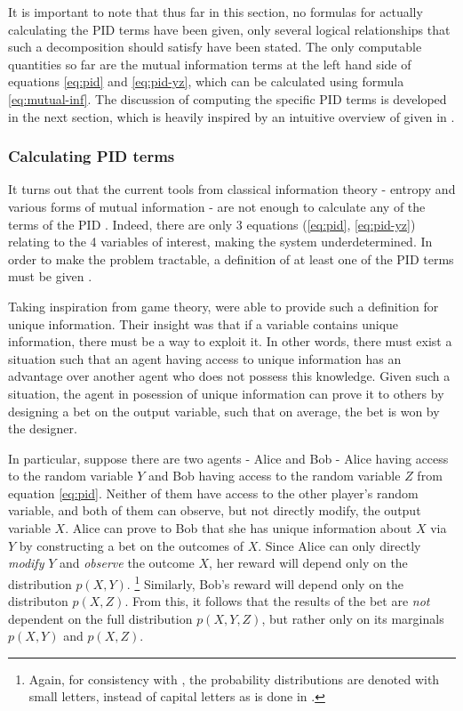 \documentclass[12pt]{article}
\begin{document}
It is important to note that thus far in this section, no formulas for actually calculating the PID terms have been given, only several logical relationships that such a decomposition should satisfy have been stated. The only computable quantities so far are the mutual information terms at the left hand side of equations \ref{eq:pid} and \ref{eq:pid-yz}, which can be calculated using formula \ref{eq:mutual-inf}. The discussion of computing the specific PID terms is developed in the next section, which is heavily inspired by an intuitive overview of \cite{bertschinger} given in \cite{pid-goal-functions}. 

\subsubsection{Calculating PID terms}

It turns out that the current tools from classical information theory - entropy and various forms of mutual information - are not enough to calculate any of the terms of the PID \cite{williams-beer}. Indeed, there are only 3 equations (\ref{eq:pid}, \ref{eq:pid-yz}) relating to the 4 variables of interest, making the system underdetermined. In order to make the problem tractable, a definition of at least one of the PID terms must be given \cite{bertschinger}.

Taking inspiration from game theory, \cite{bertschinger} were able to provide such a definition for unique information. Their insight was that if a variable contains unique information, there must be a way to exploit it. In other words, there must exist a situation such that an agent having access to unique information has an advantage over another agent who does not possess this knowledge. Given such a situation, the agent in posession of unique information can prove it to others by designing a bet on the output variable, such that on average, the bet is won by the designer.

In particular, suppose there are two agents - Alice and Bob - Alice having access to the random variable $Y$ and Bob having access to the random variable $Z$ from equation \ref{eq:pid}. Neither of them have access to the other player's random variable, and both of them can observe, but not directly modify, the output variable $X$. Alice can prove to Bob that she has unique information about $X$ via $Y$ by constructing a bet on the outcomes of $X$. Since Alice can only directly \textit{modify} $Y$ and \textit{observe} the outcome $X$, her reward will depend only on the distribution $p(X,Y)$. \footnote{Again, for consistency with \cite{cover-thomas}, the probability distributions are denoted with small letters, instead of capital letters as is done in \cite{bertschinger}.} Similarly, Bob's reward will depend only on the distributon $p(X,Z)$. From this, it follows that the results of the bet are \textit{not} dependent on the full distribution $p(X,Y,Z)$, but rather only on its marginals $p(X,Y)$ and $p(X,Z)$.
\end{document}
